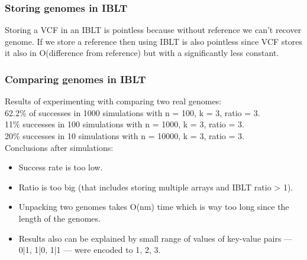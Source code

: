 \documentclass{article}
\begin{document}
\subsubsection{Storing genomes in IBLT}
Storing a VCF in an IBLT is pointless because without reference we can't recover
genome. If we store a reference then using IBLT is also pointless since VCF stores 
it also in O(difference from reference) but with a significantly less constant.
\subsubsection{Comparing genomes in IBLT}
Results of experimenting with comparing two real genomes: \\
62.2\% of successes in 1000 simulations with n = 100, k = 3, ratio = 3. \\
11\% successes in 100 simulations with n = 1000, k = 3, ratio = 3. \\
20\% successes in 10 simulations with n = 10000, k = 3, ratio = 3. \\

Conclusions after simulations:
\begin{itemize}
    \item Success rate is too low.
    \item Ratio is too big (that includes storing multiple arrays and IBLT
        ratio > 1).
    \item Unpacking two genomes takes O(nm) time which is way too long since the
        length of the genomes. 
    \item Results also can be explained by small range of values of key-value 
        pairs --- 0|1, 1|0, 1|1 --- were encoded to 1, 2, 3.
\end{itemize}
\end{document}
